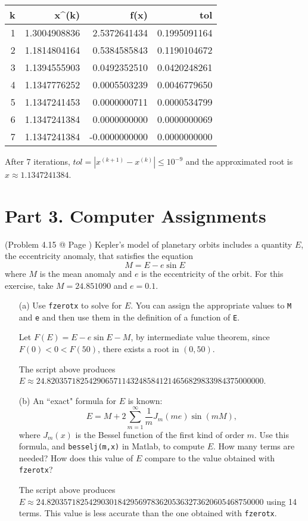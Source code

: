 \documentclass[10pt]{report}
\newcommand{\abs}[1] {\left| #1 \right|}
\begin{document}
\begin{enumerate}
\begin{enumerate}
		
		\begin{table}[H]
			\centering
			\begin{tabular}{*{4}{N}} \toprule
				k & x^{(k)} & f(x) & tol\\  & 1.3004908836 & 2.5372641434 & 0.1995091164\\
				2 & 1.1814804164 & 0.5384585843 & 0.1190104672\\
				3 & 1.1394555903 & 0.0492352510 & 0.0420248261\\
				4 & 1.1347776252 & 0.0005503239 & 0.0046779650\\
				5 & 1.1347241453 & 0.0000000711 & 0.0000534799\\
				6 & 1.1347241384 & 0.0000000000 & 0.0000000069\\
				7 & 1.1347241384 & -0.0000000000 & 0.0000000000\\
				\bottomrule
			\end{tabular}
		\end{table}
		After 7 iterations, $tol = \abs{x^{(k+1)} - x^{(k)}} \le 10^{-9}$ and the approximated root is $x\approx 1.1347241384$.
	\end{enumerate}
\end{enumerate}

\section*{Part 3. Computer Assignments}
(Problem 4.15 @ Page )
Kepler's model of planetary orbits includes a quantity $E$, the eccentricity anomaly, that satisfies the equation
\[
M = E - e\sin E
\]
where $M$ is the mean anomaly and $e$ is the eccentricity of the orbit. For this exercise, take $M = 24.851090$ and $e = 0.1$.
\begin{enumerate}
	\item [(a)]
	Use \texttt{fzerotx} to solve for $E$. You can assign the appropriate values to \texttt{M} and \texttt{e} and then use them in the definition of a function of \texttt{E}.
	
	Let $F(E) = E - e\sin E - M$, by intermediate value theorem, since $F(0) < 0 < F(50)$, there exists a root in $(0,50)$.
	
	The script above produces $E\approx 24.8203571825429065711432485841214656829833984375000000$.
	
	\item [(b)]
	An ``exact" formula for $E$ is known:
	\[
	E = M + 2\sum_{m=1}^{\infty} \frac{1}{m}J_m(me)\sin(mM),
	\]
	where $J_m(x)$ is the Bessel function of the first kind of order $m$. Use this formula, and \texttt{besselj(m,x)} in Matlab, to compute $E$. How many terms are needed? How does this value of $E$ compare to the value obtained with \texttt{fzerotx}?
	
	
	The script above produces $E\approx 24.8203571825429030184295697836205363273620605468750000$ using 14 terms. This value is less accurate than the one obtained with \texttt{fzerotx}.
\end{enumerate}
\end{document}
